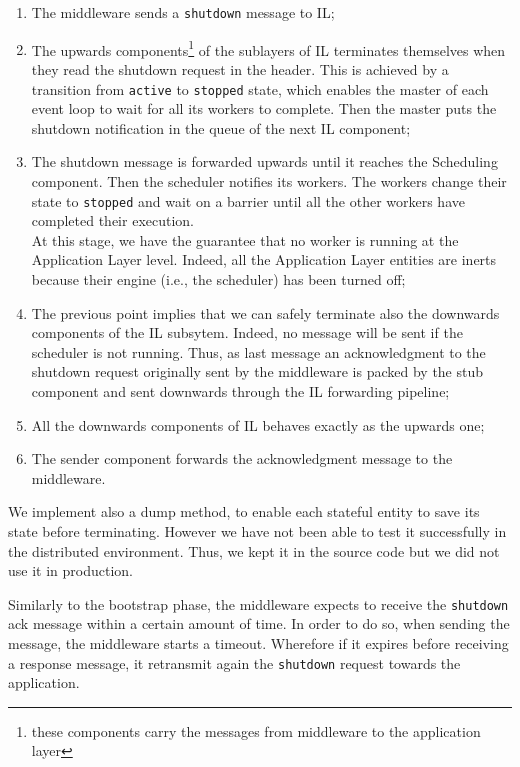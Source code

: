 \begin{enumerate}
  \item The middleware sends a \verb|shutdown| message to IL;
  \item The upwards components\footnote{these components carry the messages
  from middleware to the application layer} of the sublayers of IL terminates
  themselves when they
  read the shutdown request in the header. This is achieved by a transition
  from \verb|active| to \verb|stopped| state, which enables the master
  of each event loop to wait for all its workers to complete. Then the master
  puts the shutdown notification in the queue of the next IL component;
  \item The shutdown message is forwarded upwards until it reaches the Scheduling
  component. Then the scheduler notifies its workers. The workers change their
  state to \verb|stopped| and wait on a barrier until all the other workers have
  completed their execution. \\
  At this stage, we have the guarantee that no worker is running at
  the Application Layer level. Indeed, all the Application Layer
  entities are inerts because their engine (i.e., the scheduler) has been
  turned off;
  \item The previous point implies that we can safely terminate
  also the downwards components of the IL subsytem. Indeed, no message
  will be sent if the scheduler is not running. Thus, as last message
  an acknowledgment to the shutdown request
  originally sent by the middleware is packed
  by the stub component and sent downwards through the IL forwarding pipeline;
  \item All the downwards components of IL behaves exactly as the upwards one;
  \item The sender component forwards the acknowledgment message
  to the middleware.
\end{enumerate}


We implement also a dump method, to enable each stateful entity to save its
state before terminating. However we have not
been able to test it successfully in the distributed environment. Thus, we
kept it in the source code but we did not use it in production.



Similarly to the bootstrap phase, the middleware expects to receive the
\verb|shutdown| ack message within a certain amount of time.
In order to do so, when sending the message, the middleware starts a timeout.
Wherefore if it expires before receiving a response message,
it retransmit again the \verb|shutdown| request towards the application.
